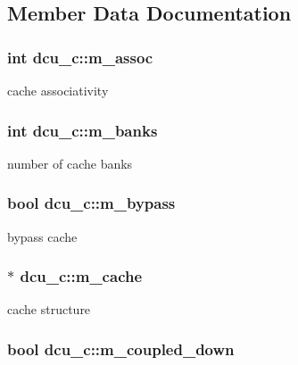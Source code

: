 \subsection{Member Data Documentation}
\hypertarget{classdcu__c_a8166e3d9828dff8f41078d92767bd920}{
\subsubsection[{m\_\-assoc}]{\setlength{\rightskip}{0pt plus 5cm}int {\bf dcu\_\-c::m\_\-assoc}}}
\label{classdcu__c_a8166e3d9828dff8f41078d92767bd920}
cache associativity \hypertarget{classdcu__c_aa1a3af160ffda7483651227049f31185}{
\subsubsection[{m\_\-banks}]{\setlength{\rightskip}{0pt plus 5cm}int {\bf dcu\_\-c::m\_\-banks}}}
\label{classdcu__c_aa1a3af160ffda7483651227049f31185}
number of cache banks \hypertarget{classdcu__c_a1991249577b208be4483eeeb98f56295}{
\subsubsection[{m\_\-bypass}]{\setlength{\rightskip}{0pt plus 5cm}bool {\bf dcu\_\-c::m\_\-bypass}}}
\label{classdcu__c_a1991249577b208be4483eeeb98f56295}
bypass cache \hypertarget{classdcu__c_a6cb56729ba3f6fd05d8071adda723317}{
\subsubsection[{m\_\-cache}]{$\ast$ {\bf dcu\_\-c::m\_\-cache}}}
\label{classdcu__c_a6cb56729ba3f6fd05d8071adda723317}
cache structure \hypertarget{classdcu__c_ac252e950738034b9eab0e1774e0e7de5}{
\subsubsection[{m\_\-coupled\_\-down}]{\setlength{\rightskip}{0pt plus 5cm}bool {\bf dcu\_\-c::m\_\-coupled\_\-down}}}
